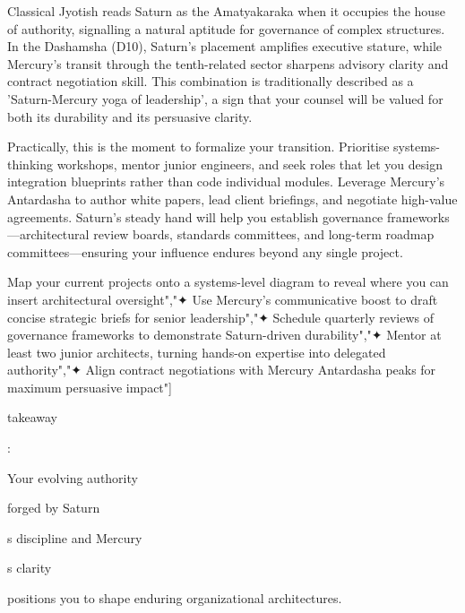 {\fontsize{9}{13}\selectfont Classical Jyotish reads Saturn as the Amatyakaraka when it occupies the house of authority, signalling a natural aptitude for governance of complex structures.  In the Dashamsha (D10), Saturn's placement amplifies executive stature, while Mercury's transit through the tenth-related sector sharpens advisory clarity and contract negotiation skill.  This combination is traditionally described as a 'Saturn-Mercury yoga of leadership', a sign that your counsel will be valued for both its durability and its persuasive clarity.}\par\vspace{1.8mm}

{\fontsize{9}{13}\selectfont Practically, this is the moment to formalize your transition.  Prioritise systems-thinking workshops, mentor junior engineers, and seek roles that let you design integration blueprints rather than code individual modules.  Leverage Mercury's Antardasha to author white papers, lead client briefings, and negotiate high-value agreements.  Saturn's steady hand will help you establish governance frameworks---architectural review boards, standards committees, and long-term roadmap committees---ensuring your influence endures beyond any single project.}\par\vspace{1.8mm}

\begin{diamondlist}
  \item {\fontsize{8.5}{12}\selectfont Map your current projects onto a systems-level diagram to reveal where you can insert architectural oversight","✦ Use Mercury's communicative boost to draft concise strategic briefs for senior leadership","✦ Schedule quarterly reviews of governance frameworks to demonstrate Saturn-driven durability","✦ Mentor at least two junior architects, turning hands-on expertise into delegated authority","✦ Align contract negotiations with Mercury Antardasha peaks for maximum persuasive impact"]}
  \item {\fontsize{8.5}{12}\selectfont takeaway}
  \item {\fontsize{8.5}{12}\selectfont :}
  \item {\fontsize{8.5}{12}\selectfont Your evolving authority}
  \item {\fontsize{8.5}{12}\selectfont forged by Saturn}
  \item {\fontsize{8.5}{12}\selectfont s discipline and Mercury}
  \item {\fontsize{8.5}{12}\selectfont s clarity}
  \item {\fontsize{8.5}{12}\selectfont positions you to shape enduring organizational architectures.}
\end{diamondlist}

